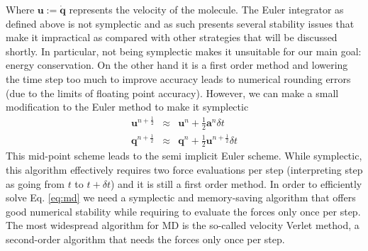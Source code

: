 \documentclass[ twoside,openright,titlepage,numbers=noenddot,%
headinclude,footinclude,cleardoublepage=empty,abstract=on,
BCOR=5mm,paper=b5,fontsize=11pt, dvipsnames
]{scrreprt}
\renewcommand{\vec}[1]{\bm{#1}}
\newcommand{\dt}{\delta t}
\newcommand{\half}{\frac{1}{2}}
\newcommand{\ppos}{q}
\newcommand{\pvel}{u}
\begin{document}
Where $\vec{\pvel} := \dot{\vec{\ppos}}$ represents the velocity of the molecule.
The Euler integrator as defined above is not symplectic\cite{Hairer2006} and as such presents several stability issues that make it impractical as compared with other strategies that will be discussed shortly. In particular, not being symplectic makes it unsuitable for our main goal: energy conservation\cite{Hairer2006}. On the other hand it is a first order method and lowering the time step too much to improve accuracy leads to numerical rounding errors (due to the limits of floating point accuracy).
However, we can make a small modification to the Euler method to make it symplectic\cite{Hairer2006}
\begin{equation}
  \label{eq:semiimpliciteuler}
  \begin{aligned}
    \vec{\pvel}^{n+\half} &\approx& \vec{\pvel}^n + \half\vec{a}^n\dt\\
    \vec{\ppos}^{n+\half} &\approx& \vec{\ppos}^n + \half\vec{\pvel}^{n+\half}\dt
  \end{aligned}
\end{equation}
This mid-point scheme leads to the semi implicit Euler scheme. While symplectic, this algorithm effectively requires two force evaluations per step (interpreting step as going from $t$ to $t+\dt$) and it is still a first order method.
In order to efficiently solve Eq. \eqref{eq:md} we need a symplectic and memory-saving algorithm that offers good numerical stability while requiring to evaluate the forces only once per step.
The most widespread algorithm for \gls{MD} is the so-called velocity Verlet method\cite{Allen2017}, a second-order algorithm that needs the forces only once per step.
\end{document}
